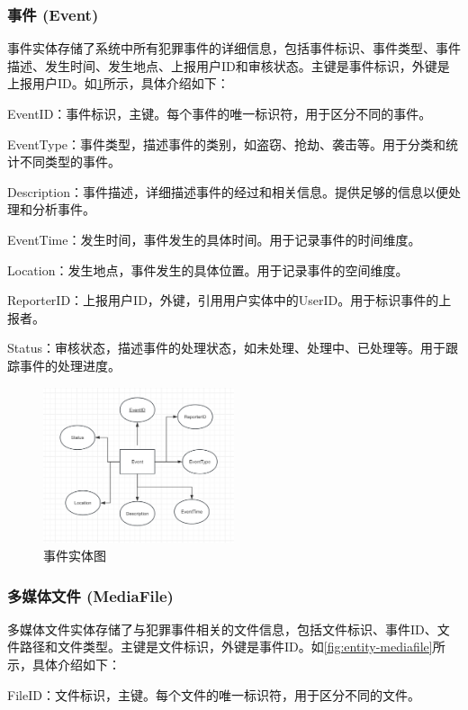 \subsubsection{事件 (Event)}

事件实体存储了系统中所有犯罪事件的详细信息，包括事件标识、事件类型、事件描述、发生时间、发生地点、上报用户ID和审核状态。主键是事件标识，外键是上报用户ID。如\cref{fig:entity-event}所示，具体介绍如下：

EventID：事件标识，主键。每个事件的唯一标识符，用于区分不同的事件。

EventType：事件类型，描述事件的类别，如盗窃、抢劫、袭击等。用于分类和统计不同类型的事件。

Description：事件描述，详细描述事件的经过和相关信息。提供足够的信息以便处理和分析事件。

EventTime：发生时间，事件发生的具体时间。用于记录事件的时间维度。

Location：发生地点，事件发生的具体位置。用于记录事件的空间维度。

ReporterID：上报用户ID，外键，引用用户实体中的UserID。用于标识事件的上报者。

Status：审核状态，描述事件的处理状态，如未处理、处理中、已处理等。用于跟踪事件的处理进度。

\begin{figure}[htbp]
    \centering
    \includegraphics[width=0.5\textwidth]{figures/db-img-02.png}
    \caption{事件实体图}
    \label{fig:entity-event}
\end{figure}

\subsubsection{多媒体文件 (MediaFile)}

多媒体文件实体存储了与犯罪事件相关的文件信息，包括文件标识、事件ID、文件路径和文件类型。主键是文件标识，外键是事件ID。如\cref{fig:entity-mediafile}所示，具体介绍如下：

FileID：文件标识，主键。每个文件的唯一标识符，用于区分不同的文件。

